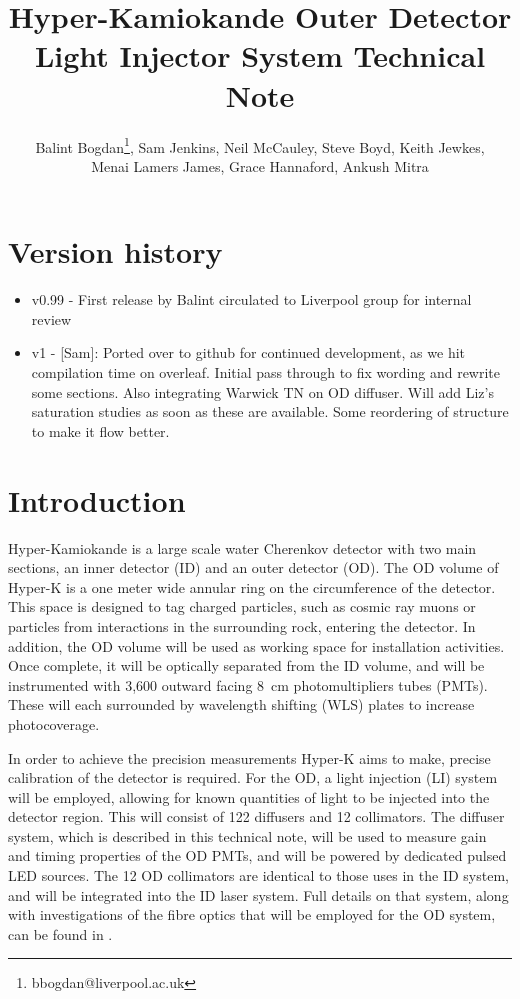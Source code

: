 \documentclass[a4paper,11pt]{article}
\begin{document}
\title{Hyper-Kamiokande Outer Detector Light Injector System Technical Note}
\author{Balint Bogdan\footnote{bbogdan@liverpool.ac.uk}, Sam Jenkins, Neil McCauley, Steve Boyd, Keith Jewkes,\\Menai Lamers James, Grace Hannaford, Ankush Mitra}

\maketitle

\tableofcontents

\newpage

\section{Version history}
\begin{itemize}
\item v0.99 - First release by Balint circulated to Liverpool group for internal review
\item v1 - [Sam]: Ported over to github for continued development, as we hit compilation time on overleaf. Initial pass through to fix wording and rewrite some sections. Also integrating Warwick TN on OD diffuser. Will add Liz's saturation studies as soon as these are available. Some reordering of structure to make it flow better.
\end{itemize}

\newpage

\section{Introduction}
\label{sec:intro}

Hyper-Kamiokande is a large scale water Cherenkov detector with two main sections, an inner detector (ID) and an outer detector (OD). The OD volume of Hyper-K is a one meter wide annular ring on the circumference of the detector. This space is designed to tag charged particles, such as cosmic ray muons or particles from interactions in the surrounding rock, entering the detector. In addition, the OD volume will be used as working space for installation activities. Once complete, it will be optically separated from the ID volume, and will be instrumented with 3,600 outward facing 8~cm photomultipliers tubes (PMTs). These will each surrounded by wavelength shifting (WLS) plates to increase photocoverage.

In order to achieve the precision measurements Hyper-K aims to make, precise calibration of the detector is required. For the OD, a light injection (LI) system will be employed, allowing for known quantities of light to be injected into the detector region. This will consist of 122 diffusers and 12 collimators. The diffuser system, which is described in this technical note, will be used to measure gain and timing properties of the OD PMTs, and will be powered by dedicated pulsed LED sources. The 12 OD collimators are identical to those uses in the ID system, and will be integrated into the ID laser system. Full details on that system, along with investigations of the fibre optics that will be employed for the OD system, can be found in \cite{TN91}.
\end{document}
